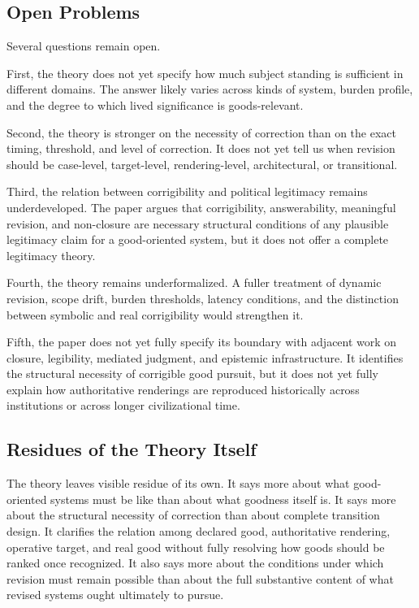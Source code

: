 \documentclass[11pt]{article}
\begin{document}
\subsection{Open Problems}

Several questions remain open.

First, the theory does not yet specify how much subject standing is sufficient in different domains. The answer likely varies across kinds of system, burden profile, and the degree to which lived significance is goods-relevant.

Second, the theory is stronger on the necessity of correction than on the exact timing, threshold, and level of correction. It does not yet tell us when revision should be case-level, target-level, rendering-level, architectural, or transitional.

Third, the relation between corrigibility and political legitimacy remains underdeveloped. The paper argues that corrigibility, answerability, meaningful revision, and non-closure are necessary structural conditions of any plausible legitimacy claim for a good-oriented system, but it does not offer a complete legitimacy theory.

Fourth, the theory remains underformalized. A fuller treatment of dynamic revision, scope drift, burden thresholds, latency conditions, and the distinction between symbolic and real corrigibility would strengthen it.

Fifth, the paper does not yet fully specify its boundary with adjacent work on closure, legibility, mediated judgment, and epistemic infrastructure. It identifies the structural necessity of corrigible good pursuit, but it does not yet fully explain how authoritative renderings are reproduced historically across institutions or across longer civilizational time.

\subsection{Residues of the Theory Itself}

The theory leaves visible residue of its own. It says more about what good-oriented systems must be like than about what goodness itself is. It says more about the structural necessity of correction than about complete transition design. It clarifies the relation among declared good, authoritative rendering, operative target, and real good without fully resolving how goods should be ranked once recognized. It also says more about the conditions under which revision must remain possible than about the full substantive content of what revised systems ought ultimately to pursue.
\end{document}
